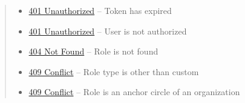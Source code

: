 \documentclass[letterpaper,10pt,english]{sphinxmanual}
\begin{document}
\begin{fulllineitems}
\begin{quote}
\begin{description}
\begin{itemize}
\item {} 
\href{http://www.w3.org/Protocols/rfc2616/rfc2616-sec10.html\#sec10.4.2}{401 Unauthorized} -- Token has expired

\item {} 
\href{http://www.w3.org/Protocols/rfc2616/rfc2616-sec10.html\#sec10.4.2}{401 Unauthorized} -- User is not authorized

\item {} 
\href{http://www.w3.org/Protocols/rfc2616/rfc2616-sec10.html\#sec10.4.5}{404 Not Found} -- Role is not found

\item {} 
\href{http://www.w3.org/Protocols/rfc2616/rfc2616-sec10.html\#sec10.4.10}{409 Conflict} -- Role type is other than custom

\item {} 
\href{http://www.w3.org/Protocols/rfc2616/rfc2616-sec10.html\#sec10.4.10}{409 Conflict} -- Role is an anchor circle of an organization

\end{itemize}

\end{description}\end{quote}

\end{fulllineitems}
\end{document}
